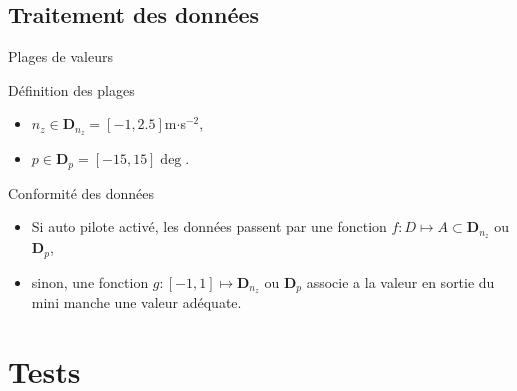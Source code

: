 \documentclass[footheight=2em]{beamer}
\begin{document}
\subsection{Traitement des données}
\begin{frame}[t]{Plages de valeurs}
  \begin{block}{Définition des plages}
    \begin{itemize}
      \item \(n_z \in \mathbf{D}_{n_z} = [-1, 2.5]\)m\(\cdot\)s\(^{-2}\),
      \item \(p \in \mathbf{D}_p = [-15, 15]\deg\).
    \end{itemize}
  \end{block}
  \begin{block}{Conformité des données}
    \begin{itemize}
      \item Si auto pilote activé, les données passent par une
        fonction \(f\colon D\mapsto A\subset \mathbf{D}_{n_z}\) ou
        \(\mathbf{D}_p\),
      \item sinon, une fonction \(g\colon[-1, 1] \mapsto \mathbf{D}_{n_z}\) ou
        \(\mathbf{D}_p\) associe a la valeur en sortie du mini manche une valeur
        adéquate.
    \end{itemize}
  \end{block}
\end{frame}


\section{Tests}
\end{document}
